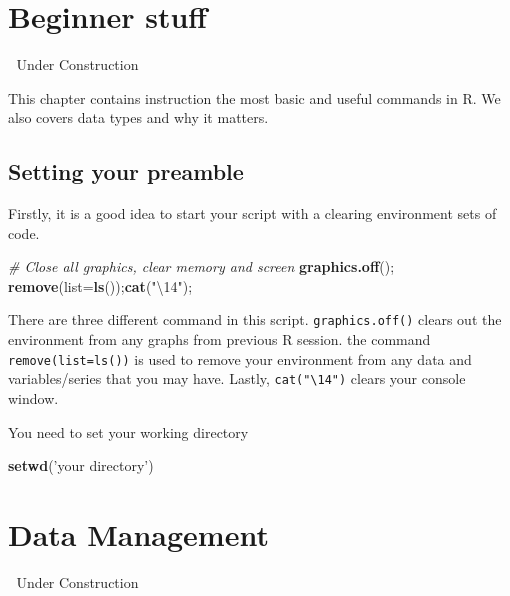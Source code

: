 \documentclass[
]{book}
\newenvironment{Shaded}{\begin{snugshade}}{\end{snugshade}}
\newcommand{\CommentTok}[1]{\textcolor[rgb]{0.56,0.35,0.01}{\textit{#1}}}
\newcommand{\DataTypeTok}[1]{\textcolor[rgb]{0.13,0.29,0.53}{#1}}
\newcommand{\KeywordTok}[1]{\textcolor[rgb]{0.13,0.29,0.53}{\textbf{#1}}}
\newcommand{\NormalTok}[1]{#1}
\newcommand{\StringTok}[1]{\textcolor[rgb]{0.31,0.60,0.02}{#1}}
\begin{document}
\hypertarget{beginner-stuff}{%
\chapter{Beginner stuff}\label{beginner-stuff}}

🚧 Under Construction 🚧

This chapter contains instruction the most basic and useful commands in R. We also covers data types and why it matters.

\hypertarget{setting-your-preamble}{%
\section{Setting your preamble}\label{setting-your-preamble}}

Firstly, it is a good idea to start your script with a clearing environment sets of code.

\begin{Shaded}
\begin{Highlighting}[]
\CommentTok{# Close all graphics, clear memory and screen}
\KeywordTok{graphics.off}\NormalTok{(); }\KeywordTok{remove}\NormalTok{(}\DataTypeTok{list=}\KeywordTok{ls}\NormalTok{());}\KeywordTok{cat}\NormalTok{(}\StringTok{"\textbackslash{}14"}\NormalTok{);}
\end{Highlighting}
\end{Shaded}

There are three different command in this script. \texttt{graphics.off()} clears out the environment from any graphs from previous R session. the command \texttt{remove(list=ls())} is used to remove your environment from any data and variables/series that you may have. Lastly, \texttt{cat("\textbackslash{}14")} clears your console window.

You need to set your working directory

\begin{Shaded}
\begin{Highlighting}[]
\KeywordTok{setwd}\NormalTok{(}\StringTok{'your directory'}\NormalTok{)}
\end{Highlighting}
\end{Shaded}

\hypertarget{data-management}{%
\chapter{Data Management}\label{data-management}}

🚧 Under Construction 🚧
\end{document}
